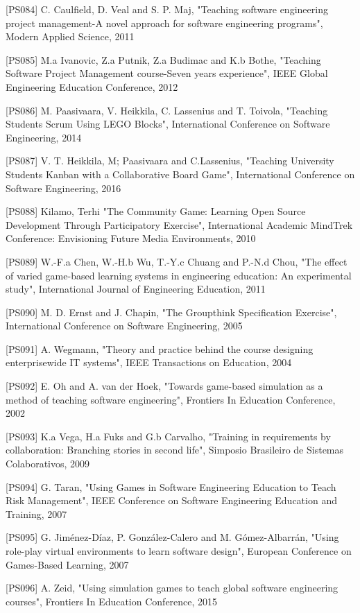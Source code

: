 [PS084]	C. Caulfield, D. Veal and S. P. Maj, "Teaching software engineering project management-A novel approach for software engineering programs", Modern Applied Science, 2011

[PS085]	M.a Ivanovic, Z.a Putnik, Z.a Budimac and K.b Bothe, "Teaching Software Project Management course-Seven years experience", IEEE Global Engineering Education Conference, 2012

[PS086]	M. Paasivaara, V. Heikkila, C. Lassenius and T. Toivola, "Teaching Students Scrum Using LEGO Blocks", International Conference on Software Engineering, 2014

[PS087]	V. T. Heikkila, M; Paasivaara and C.Lassenius, "Teaching University Students Kanban with a Collaborative Board Game", International Conference on Software Engineering, 2016

[PS088]	Kilamo, Terhi	"The Community Game: Learning Open Source Development Through Participatory Exercise", International Academic MindTrek Conference: Envisioning Future Media Environments, 2010

[PS089]	W.-F.a Chen, W.-H.b Wu, T.-Y.c Chuang and P.-N.d Chou, "The effect of varied game-based learning systems in engineering education: An experimental study", International Journal of Engineering Education, 2011

[PS090]	M. D. Ernst and J. Chapin, "The Groupthink Specification Exercise", International Conference on Software Engineering, 2005

[PS091]	A. Wegmann, "Theory and practice behind the course designing enterprisewide IT systems", IEEE Transactions on Education, 2004

[PS092]	E. Oh and A. van der Hoek, "Towards game-based simulation as a method of teaching software engineering", Frontiers In Education Conference, 2002

[PS093]	K.a Vega, H.a Fuks and G.b Carvalho, "Training in requirements by collaboration: Branching stories in second life", Simposio Brasileiro de Sistemas Colaborativos, 2009

[PS094]	G. Taran, "Using Games in Software Engineering Education to Teach Risk Management", IEEE Conference on Software Engineering Education and Training, 2007

[PS095]	G. Jiménez-Díaz, P. González-Calero and M. Gómez-Albarrán, "Using role-play virtual environments to learn software design", European Conference on Games-Based Learning, 2007

[PS096]	A. Zeid, "Using simulation games to teach global software engineering courses", Frontiers In Education Conference, 2015

